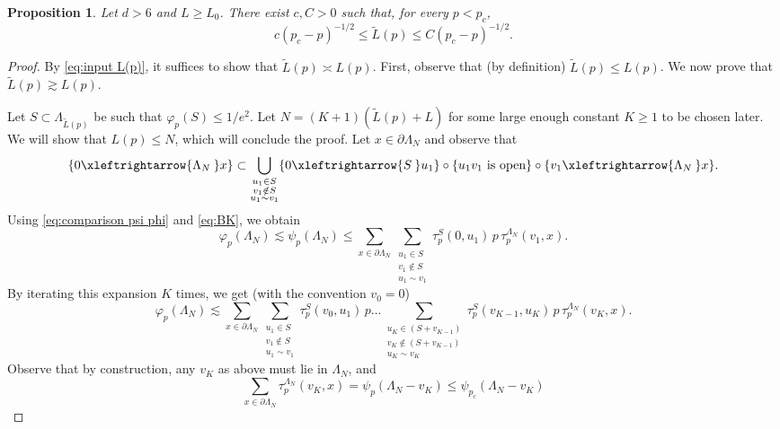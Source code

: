 \documentclass[11pt,a4paper]{article}
\numberwithin{equation}{section}
\theoremstyle{plain}
\newtheorem{Prop}[Thm]{Proposition}
\theoremstyle{definition}
\newcommand{\connect}{\xleftrightarrow}
\newcommand{\1}{\mathbf 1}
\def \p {{\partial}}
\begin{document}
\begin{Prop}\label{prop:equivalence of sharp length}
 Let $d>6$ and $L\geq L_0$. There exist $c,C>0$ such that, for every $p<p_c$,
\begin{equation}
	c(p_c-p)^{-1/2}\leq \tilde{L}(p)\leq C(p_c-p)^{-1/2}.
\end{equation}
\end{Prop}
\begin{proof} By \eqref{eq:input L(p)}, it suffices to show that $\tilde{L}(p)\asymp L(p)$. First, observe that (by definition) $\tilde L(p) \leq L(p)$. 
We now prove that $\tilde{L}(p)\gtrsim L(p)$. 

Let $S\subset \Lambda_{\tilde{L}(p)}$ be such that $\varphi_p(S)\leq 1/e^2$. Let $N= (K+1) (\tilde{L}(p)+L)$ for some large enough constant $K\geq 1$ to be chosen later. We will show that $L(p)\leq N$, which will conclude the proof. 
Let $x\in \partial \Lambda_N$ and observe that
\begin{equation}
\{0\connect{\Lambda_N\:} x\} \subset \bigcup_{\substack{u_1\in S\\ v_1\notin S\\ u_1\sim v_1}} \{0\connect{S\:} u_1\} \circ \{u_1v_1 \text{ is open}\} \circ \{v_1 \connect{\Lambda_N\:} x\}.
\end{equation}
 Using \eqref{eq:comparison psi phi} and \eqref{eq:BK}, we obtain 
\begin{equation}
\varphi_p(\Lambda_N)\lesssim  \psi_p(\Lambda_N) \leq \sum_{x\in\partial\Lambda_N}  \sum_{\substack{u_1\in S\\ v_1\notin S \\ u_1\sim v_1}} \tau_p^S(0,u_1)\,p\,  \tau_p^{\Lambda_N}(v_1,x).
\end{equation}
By iterating this expansion $K$ times, we get (with the convention $v_0=0$)
\begin{equation}\label{eq:iterated-phi}
	\varphi_p(\Lambda_N)\lesssim  \sum_{x\in\partial\Lambda_N}  
	\sum_{\substack{u_1\in S\\ v_1\notin S \\ u_1\sim v_1}} \tau_p^S(v_0,u_1)\,p
	\ldots\sum_{\substack{u_{K}\in (S+v_{K-1})\\ v_{K}\notin (S+v_{K-1}) \\ u_K\sim v_K}} \tau_p^S(v_{K-1},u_K)\,p\, \tau_p^{\Lambda_N}(v_K,x).\end{equation}
Observe that by construction, any $v_K$ as above must lie in $\Lambda_N$, and 
\begin{equation}\label{eq:bound_vK}
\sum_{x\in  \p \Lambda_N} \tau_p^{\Lambda_N}(v_K,x)=\psi_{p}(\Lambda_N-v_K)\leq \psi_{p_c}(\Lambda_N-v_K)   

\end{equation}
\end{proof}
\end{document}
